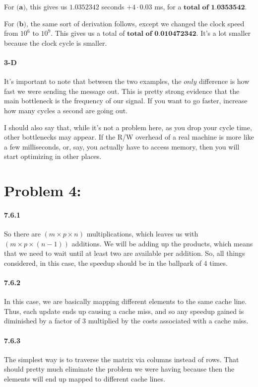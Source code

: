 \documentclass[a4paper]{article}
\begin{document}
For $\textbf{(a)}$, this gives us $1.0352342$ seconds $+ 4 \cdot 0.03$ ms, for a $\textbf{total of 1.0353542}$.

For $\textbf{(b)}$, the same sort of derivation follows, except we changed the clock speed from $10^6$ to $10^9$. This gives us a total of $\textbf{total of 0.010472342}$. It's a lot smaller because the clock cycle is smaller.

\paragraph{3-D} It's important to note that between the two examples, the $\textit{only}$ difference is how fast we were sending the message out. This is pretty strong evidence that the main bottleneck is the frequency of our signal. If you want to go faster, increase how many cycles a second are going out.

I should also say that, while it's not a problem here, as you drop your cycle time, other bottlenecks may appear. If the R/W overhead of a real machine is more like a few milliseconds, or, say, you actually have to access memory, then you will start optimizing in other places.

\section*{Problem 4:}

\paragraph{7.6.1} So there are $(m \times p \times n)$ multiplications, which leaves us with $(m \times p \times (n-1))$ additions. We will be adding up the products, which means that we need to wait until at least two are available per addition. So, all things considered, in this case, the speedup should be in the ballpark of 4 times.

\paragraph{7.6.2} In this case, we are basically mapping different elements to the same cache line. Thus, each update ends up causing a cache miss, and so any speedup gained is diminished by a factor of 3 multiplied by the costs associated with a cache miss.

\paragraph{7.6.3} The simplest way is to traverse the matrix via columns instead of rows. That should pretty much eliminate the problem we were having because then the elements will end up mapped to different cache lines.
\end{document}
